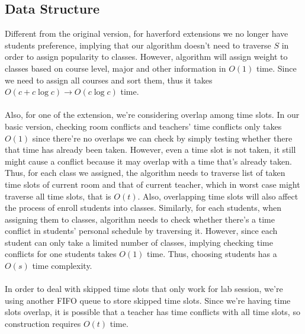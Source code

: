 \documentclass[11pt, oneside]{article}   	%
\begin{document}
\subsection{Data Structure}
Different from the original version, for haverford extensions we no longer have students preference, implying that our algorithm doesn't need to traverse $S$ in order to assign popularity to classes. However, algorithm will assign weight to classes based on course level, major and other information in $O(1)$ time. Since we need to assign all courses and sort them, thus it takes $O(c+c\log c) \to O(c\log c)$ time.\\
\\Also, for one of the extension, we're considering overlap among time slots. In our basic version, checking room conflicts and teachers' time conflicts only takes $O(1)$ since there're no overlaps we can check by simply testing whether there that time has already been taken. However, even a time slot is not taken, it still might cause a conflict because it may overlap with a time that's already taken. Thus, for each class we assigned, the algorithm needs to traverse list of taken time slots of current room and that of current teacher, which in worst case might traverse all time slots, that is $O(t)$. Also, overlapping time slots will also affect the process of enroll students into classes. Similarly, for each students, when assigning them to classes, algorithm needs to check whether there's a time conflict in students' personal schedule by traversing it. However, since each student can only take a limited number of classes, implying checking time conflicts for one students takes $O(1)$ time. Thus, choosing students has a $O(s)$ time complexity.\\
\\In order to deal with skipped time slots that only work for lab session, we're using another FIFO queue to store skipped time slots. Since we're having time slots overlap, it is possible that a teacher has time conflicts with all time slots, so construction requires $O(t)$ time.\\
\end{document}
